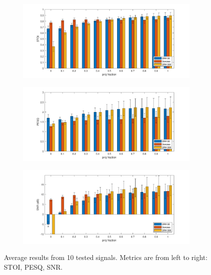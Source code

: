 \documentclass[conference]{IEEEtran}
\newcommand{\todo}[1]{\textcolor{red}{#1}}
\begin{document}
\begin{figure}[t]
	\begin{subfigure}{.33\textwidth}
		\centering
		\includegraphics[width=1.1\linewidth]{figures/lam1_stoi}  
	\end{subfigure}
	\begin{subfigure}{.33\textwidth}
		\centering
		\includegraphics[width=1.1\linewidth]{figures/lam1_PESQ}  
	\end{subfigure}
	\begin{subfigure}{.33\textwidth}
		\centering
		\includegraphics[width=1.1\linewidth]{figures/lam1_SNR}  
	\end{subfigure}
	\caption{Average results from 10 tested signals. Metrics are from left to right: STOI, PESQ, SNR.
		}
	\label{fig:final3witherrors}
\end{figure}
\end{document}
